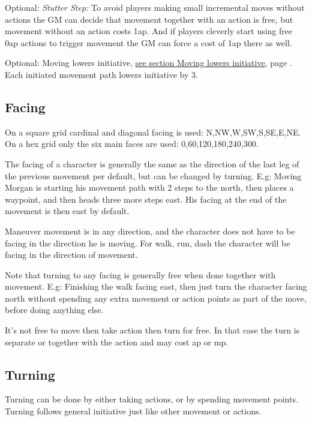Optional: \emph{Stutter Step:} To avoid players making small incremental moves without actions the GM can decide that movement together with an action is free, but movement without an action costs 1ap. And if players cleverly start using free 0ap actions to trigger movement the GM can force a cost of 1ap there as well.

Optional: Moving lowers initiative, \hyperref[sec:movinglowersinitiative]{see section Moving lowers initiative}, page \pageref{sec:movinglowersinitiative}. Each initiated movement path lowers initiative by 3.


\subsection*{Facing}
On a square grid cardinal and diagonal facing is used: N,NW,W,SW,S,SE,E,NE.
On a hex grid only the six main faces are used: 0,60,120,180,240,300\degree.

The facing of a character is generally the same as the direction of the last leg of the previous movement per default, but can be changed by turning. E.g: Moving Morgan is starting his movement path with 2 steps to the north, then places a waypoint, and then heads three more steps east. His facing at the end of the movement is then east by default.

Maneuver movement is in any direction, and the character does not have to be facing in the direction he is moving. For walk, run, dash the character will be facing in the direction of movement.

Note that turning to any facing is generally free when done together with movement. E.g: Finishing the walk facing east, then just turn the character facing north without spending any extra movement or action points as part of the move, before doing anything else.

It's not free to move then take action then turn for free. In that case the turn is separate or together with the action and may cost ap or mp.


\subsection*{Turning}
Turning can be done by either taking actions, or by spending movement points. Turning follows general initiative just like other movement or actions.


